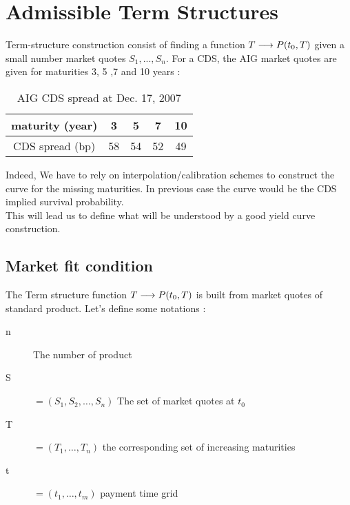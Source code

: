 

\section{Admissible Term Structures}
\label{sec:admissible-curve}

Term-structure  construction consist  of finding  a function  $T \longrightarrow  P(t_0,T)$
given a small number market quotes $S_1,...,S_n$. For a CDS, the AIG market quotes
are given for maturities 3, 5 ,7 and 10 years :

\begin{table}[H]
  \centering
  \begin{tabular}{|c|c|c|c|c|}
    \hline
    maturity (year) & 3 & 5 & 7 & 10 \\
    \hline
    CDS spread (bp) & 58 & 54 & 52 & 49\\
    \hline
  \end{tabular}
  \caption{AIG CDS spread at Dec. 17, 2007}
\end{table}

Indeed, We  have to rely  on interpolation/calibration schemes to  construct the
curve for the  missing maturities. In previous  case the curve would  be the CDS
implied survival probability.\\
This  will lead  us  to define  what  will be  understood by  a  good yield  curve
construction.

\subsection{Market fit condition}
\label{sec:market-fit-condition}

The Term  structure function $T  \longrightarrow P(t_0,T)$ is  built from market  quotes of
standard product. Let's define some notations :
\begin{description}
\item[n] The number of product
\item[S] $=(S_1,S_2,\dots,S_n)$ The set of market quotes at $t_0$
\item[T] $=(T_1,\dots,T_n)$ the corresponding set of increasing maturities 
\item[t] $=(t_1,\dots,t_m)$ payment time grid
\end{description}

